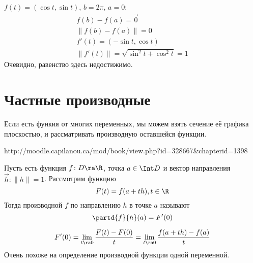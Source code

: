 \begin{exmp}
	$f(t) = (\cos t, \sin t)$, $b = 2\pi$, $a = 0$:
	\begin{gather*}
		f(b) - f(a) = \vec 0 \\
		\| f(b) - f(a) \| = 0 \\
		f'(t) = (-\sin t, \cos t) \\
		\| f'(t) \| = \sqrt{\sin^2 t + \cos^2 t} = 1
	\end{gather*}
	Очевидно, равенство здесь недостижимо.
\end{exmp}

\section{Частные производные}

Если есть функия от многих переменных, мы можем взять сечение её графика плоскостью, и рассматривать производную оставшейся функции.

\begin{center}
\small http://moodle.capilanou.ca/mod/book/view.php?id=328667\&chapterid=1398
\end{center}

\begin{Def}
	Пусть есть функция $f\colon D \ra \R$, точка $a \in \Int D$ и вектор направления $\vec h\colon \|h\| = 1$.
	Рассмотрим функцию
	\[ F(t) = f(a + th), t \in \R \]
	Тогда производной $f$ по направлению $h$ в точке $a$ называют
	\[ \partd{f}{h}(a) = F'(0) \]
\end{Def}

\begin{Rem}
	\[ F'(0) = \lim_{t \ra 0} \frac{F(t) - F(0)}t = \lim_{t \ra 0} \frac{f(a + th) - f(a)}t \]
	Очень похоже на определение производной функции одной переменной.
\end{Rem}

